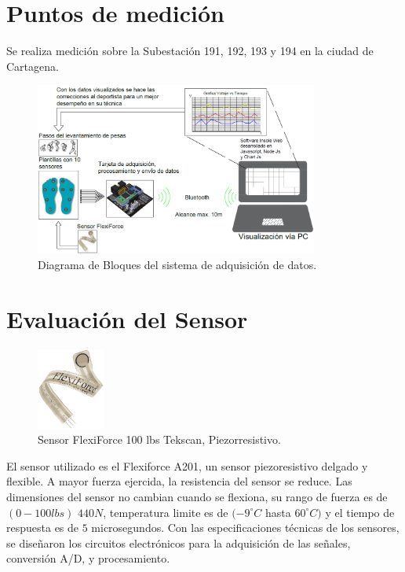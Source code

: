 \section{Puntos de medición}

Se realiza medición sobre la Subestación 191, 192, 193 y 194 en la ciudad de Cartagena.


\begin{figure}[H]
\centering
\includegraphics[width=0.83\textwidth]{./image/Diagrama_de_Bloques_sistema_Insole.png}
\caption{Diagrama de Bloques del sistema de adquisición de datos.}
\label{fig:DiagramaBloque}
\end{figure}


\section{Evaluación del Sensor}

\begin{figure}
\centering
\includegraphics[width=0.2\textwidth]{./image/SensorFlexiForce.png}
\caption{Sensor FlexiForce 100 lbs Tekscan, Piezorresistivo.}
\label{fig:Sensor}
\end{figure}

El sensor utilizado es el Flexiforce A201, un sensor piezoresistivo delgado y flexible. A mayor fuerza ejercida, la resistencia del sensor se reduce. Las dimensiones del sensor no cambian cuando se flexiona, su rango de fuerza es de $(0-100lbs)$ $440N$, temperatura limite es de $(-9^\circ C$ hasta $60^\circ C)$ y el tiempo de respuesta es de $5$ microsegundos. Con las especificaciones técnicas de los sensores, se diseñaron los circuitos electrónicos para la adquisición de las señales, conversión A/D, y procesamiento.


